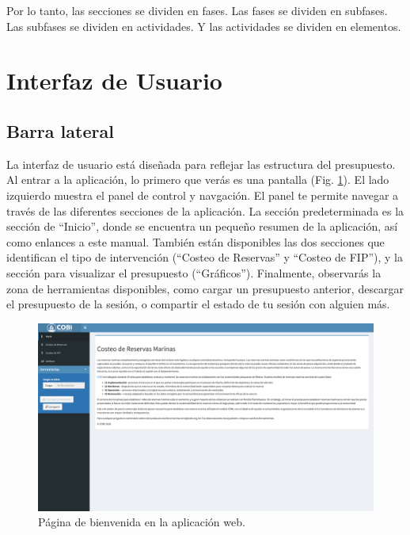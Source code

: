 \documentclass[
]{book}
\begin{document}
Por lo tanto, las secciones se dividen en fases. Las fases se dividen en subfases. Las subfases se dividen en actividades. Y las actividades se dividen en elementos.

\hypertarget{interfaz-de-usuario}{%
\section{Interfaz de Usuario}\label{interfaz-de-usuario}}

\hypertarget{barra-lateral}{%
\subsection{Barra lateral}\label{barra-lateral}}

La interfaz de usuario está diseñada para reflejar las estructura del presupuesto. Al entrar a la aplicación, lo primero que verás es una pantalla (Fig. \ref{fig:landing-page}). El lado izquierdo muestra el panel de control y navgación. El panel te permite navegar a través de las diferentes secciones de la aplicación. La sección predeterminada es la sección de ``Inicio'', donde se encuentra un pequeño resumen de la aplicación, así como enlances a este manual. También están disponibles las dos secciones que identifican el tipo de intervención (``Costeo de Reservas'' y ``Costeo de FIP''), y la sección para visualizar el presupuesto (``Gráficos''). Finalmente, observarás la zona de herramientas disponibles, como cargar un presupuesto anterior, descargar el presupuesto de la sesión, o compartir el estado de tu sesión con alguien más.

\begin{figure}
\centering
\includegraphics{images/Screen Shot 2022-07-25 at 2.43.50 PM.png}
\caption{\label{fig:landing-page}Página de bienvenida en la aplicación web.}
\end{figure}
\end{document}
